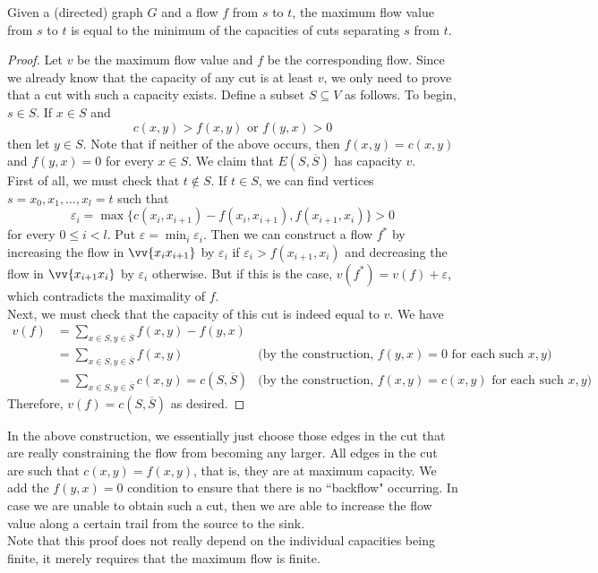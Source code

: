 \begin{ftheo}
\label{maxFlow minCut}
Given a (directed) graph $G$ and a flow $f$ from $s$ to $t$, the maximum flow value from $s$ to $t$ is equal to the minimum of the capacities of cuts separating $s$ from $t$.
\end{ftheo}
\begin{proof}
Let $v$ be the maximum flow value and $f$ be the corresponding flow. Since we already know that the capacity of any cut is at least $v$, we only need to prove that a cut with such a capacity exists.  Define a subset $S\subseteq V$ as follows. To begin, $s\in S$. If $x\in S$ and
\[
    c(x,y) > f(x,y)\text{ or }f(y,x)>0
\]
then let $y\in S$. Note that if neither of the above occurs, then $f(x,y)=c(x,y)$ and $f(y,x)=0$ for every $x\in S$. We claim that $E(S,\overline{S})$ has capacity $v$.\\

First of all, we must check that $t\not\in S$. If $t\in S$, we can find vertices $s=x_0,x_1,\ldots,x_l=t$ such that
\[ \varepsilon_i = \max\{c(x_i,x_{i+1}) - f(x_i,x_{i+1}), f(x_{i+1},x_i)\} > 0 \]
for every $0\leq i<l$. Put $\varepsilon = \min_i \varepsilon_i$. Then we can construct a flow $f^*$ by increasing the flow in $\vv{x_ix_{i+1}}$ by $\varepsilon_i$ if $\varepsilon_i > f(x_{i+1},x_i)$ and decreasing the flow in $\vv{x_{i+1}x_i}$ by $\varepsilon_i$ otherwise. But if this is the case, $v(f^*) = v(f)+\varepsilon$, which contradicts the maximality of $f$.\\

Next, we must check that the capacity of this cut is indeed equal to $v$. We have
\begin{align*}
    v(f) &= \sum_{x\in S, y\in \overline{S}} f(x,y) - f(y,x) \\
    &= \sum_{x\in S, y\in \overline{S}} f(x,y) & \text{(by the construction, $f(y,x)=0$ for each such $x,y$)} \\
    &= \sum_{x\in S, y\in \overline{S}} c(x,y) = c(S,\overline{S}) & \text{(by the construction, $f(x,y)=c(x,y)$ for each such $x,y$)}
\end{align*}
Therefore, $v(f) = c(S,\overline{S})$ as desired.
\end{proof}

In the above construction, we essentially just choose those edges in the cut that are really constraining the flow from becoming any larger. All edges in the cut are such that $c(x,y)=f(x,y)$, that is, they are at maximum capacity. We add the $f(y,x) = 0$ condition to ensure that there is no ``backflow" occurring. In case we are unable to obtain such a cut, then we are able to increase the flow value along a certain trail from the source to the sink.\\
Note that this proof does not really depend on the individual capacities being finite, it merely requires that the maximum flow is finite.\\


